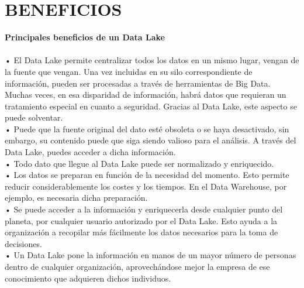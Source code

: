\section{BENEFICIOS}
\item{
\textbf{Principales beneficios de un Data Lake}\\\\
•	El Data Lake permite centralizar todos los datos en un mismo lugar, vengan de la fuente que vengan. Una vez incluidas en su silo correspondiente de información, pueden ser procesadas a través de herramientas de Big Data. Muchas veces, en esa disparidad de información, habrá datos que requieran un tratamiento especial en cuanto a seguridad. Gracias al Data Lake, este aspecto se puede solventar.\\
•	Puede que la fuente original del dato esté obsoleta o se haya desactivado, sin embargo, su contenido puede que siga siendo valioso para el análisis. A través del Data Lake, puedes acceder a dicha información.\\
•	Todo dato que llegue al Data Lake puede ser normalizado y enriquecido.\\
•	Los datos se preparan en función de la necesidad del momento. Esto permite reducir considerablemente los costes y los tiempos. En el Data Warehouse, por ejemplo, es necesaria dicha preparación.\\
•	Se puede acceder a la información y enriquecerla desde cualquier punto del planeta, por cualquier usuario autorizado por el Data Lake. Esto ayuda a la organización a recopilar más fácilmente los datos necesarios para la toma de decisiones.\\
•	Un Data Lake pone la información en manos de un mayor número de personas dentro de cualquier organización, aprovechándose mejor la empresa de ese conocimiento que adquieren dichos individuos.
}

